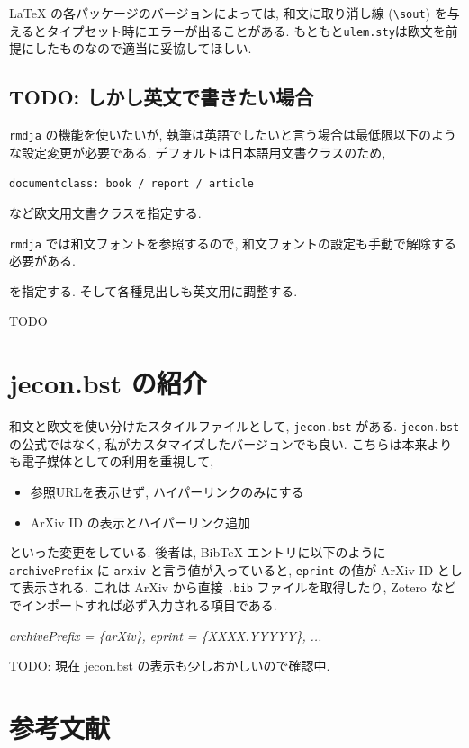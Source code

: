 \documentclass[
  nomag]{bxjsbook}
\newenvironment{Shaded}{\begin{snugshade}}{\end{snugshade}}
\newcommand{\CommentTok}[1]{\textcolor[rgb]{0.56,0.35,0.01}{\textit{#1}}}
\providecommand{\tightlist}{%
  \setlength{\itemsep}{0pt}\setlength{\parskip}{0pt}}
\theoremstyle{definition}
\theoremstyle{definition}
\theoremstyle{definition}
\theoremstyle{remark}
\begin{document}
LaTeX の各パッケージのバージョンによっては, 和文に取り消し線
(\texttt{\textbackslash{}sout})
を与えるとタイプセット時にエラーが出ることがある.
もともと\texttt{ulem.sty}は欧文を前提にしたものなので適当に妥協してほしい.

\hypertarget{todo-ux3057ux304bux3057ux82f1ux6587ux3067ux66f8ux304dux305fux3044ux5834ux5408}{%
\section{TODO:
しかし英文で書きたい場合}\label{todo-ux3057ux304bux3057ux82f1ux6587ux3067ux66f8ux304dux305fux3044ux5834ux5408}}

\texttt{rmdja} の機能を使いたいが,
執筆は英語でしたいと言う場合は最低限以下のような設定変更が必要である.
デフォルトは日本語用文書クラスのため,

\texttt{documentclass:\ book\ /\ report\ /\ article}

など欧文用文書クラスを指定する.

\texttt{rmdja} では和文フォントを参照するので,
和文フォントの設定も手動で解除する必要がある.

を指定する. そして各種見出しも英文用に調整する.

TODO

\hypertarget{jecon.bst-ux306eux7d39ux4ecb}{%
\chapter{jecon.bst の紹介}\label{jecon.bst-ux306eux7d39ux4ecb}}

和文と欧文を使い分けたスタイルファイルとして, \texttt{jecon.bst} がある.
\texttt{jecon.bst} の公式ではなく,
私がカスタマイズしたバージョンでも良い.
こちらは本来よりも電子媒体としての利用を重視して,

\begin{itemize}
\tightlist
\item
  参照URLを表示せず, ハイパーリンクのみにする
\item
  ArXiv ID の表示とハイパーリンク追加
\end{itemize}

といった変更をしている. 後者は, BibTeX エントリに以下のように
\texttt{archivePrefix} に \texttt{arxiv} と言う値が入っていると,
\texttt{eprint} の値が ArXiv ID として表示される. これは ArXiv から直接
\texttt{.bib} ファイルを取得したり, Zotero
などでインポートすれば必ず入力される項目である.

\begin{Shaded}
\begin{Highlighting}[]
\CommentTok{archivePrefix = \{arXiv\},}
\CommentTok{eprint = \{XXXX.YYYYY\},}
\CommentTok{...}
\end{Highlighting}
\end{Shaded}

TODO: 現在 jecon.bst の表示も少しおかしいので確認中.

\chapter*{参考文献}

\printbibliography
\end{document}
